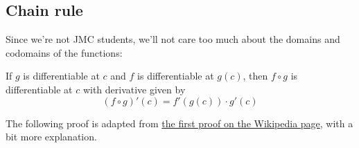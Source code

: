 
\subsection{Chain rule}
Since we're not JMC students, we'll not care too much about the domains and codomains of the functions:
\begin{theorem}
  If $g$ is differentiable at $c$ and $f$ is differentiable at $g(c)$, then $f \circ g$ is differentiable at $c$ with derivative given by 
  \[
    (f \circ g)'(c) = f'(g(c)) \cdot g'(c)
  \]
\end{theorem}
The following proof is adapted from \href{https://en.wikipedia.org/wiki/Chain_rule#First_proof}{the first proof on the Wikipedia page}, with a bit more explanation.
